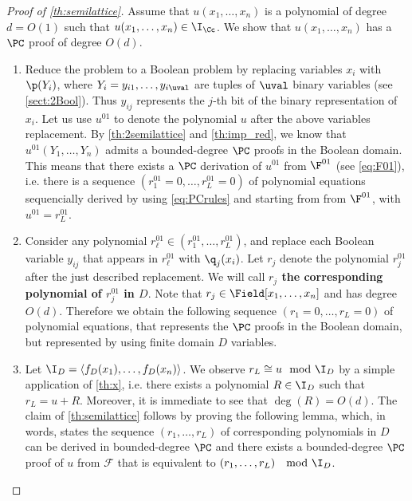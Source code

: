 \documentclass[11pt]{article}
\begin{document}
\begin{proof} [Proof of \cref{th:semilattice}]
    Assume that $u(x_1,\ldots,x_n)$ is a polynomial of degree $d=O(1)$ such that  $u(x_1,\ldots,x_n)\in \I_\Cc$. We show that $u(x_1,\ldots,x_n)$ has a $\PC$ proof of degree $O(d)$.
    \begin{enumerate}
        \item Reduce the problem to a Boolean problem by replacing variables $x_i$ with $\p(Y_i)$, where $Y_i = y_{i1}, \dots, y_{i\uval}$ are tuples of $\uval$ binary variables (see \cref{sect:2Bool}). Thus $y_{ij}$ represents the $j$-th bit of the binary representation of $x_i$. Let us use $u^{01}$ to denote the polynomial $u$ after the above variables replacement. By \cref{th:2semilattice} and \cref{th:imp_red}, we know that $u^{01}(Y_1,\ldots,Y_n)$ admits a bounded-degree $\PC$ proofs in the Boolean domain. This means that there exists a {$\PC$ derivation} of $u^{01}$ from $\F^{01}$ (see \cref{eq:F01}), i.e. there is a sequence $(r_1^{01}=0,\ldots,r_L^{01}=0)$ of polynomial equations sequencially derived by using \eqref{eq:PCrules} and starting from from $\F^{01}$, with $u^{01}=r_L^{01}$.
        \item\label{def_corr} Consider any polynomial $r^{01}_\ell\in (r_1^{01},\ldots,r_L^{01})$, and replace each Boolean variable $y_{ij}$ that appears in $r^{01}_\ell$ with $\q_j(x_i)$.  Let $r_j$ denote the polynomial $r_j^{01}$ after the just described replacement.
        We will call \textbf{$r_j$ the corresponding polynomial of $r_j^{01}$ in $D$}.
        Note that $r_j\in \Field[x_1, \ldots, x_n]$ and has degree $O(d)$. Therefore we obtain the following sequence $(r_1=0,\ldots,r_L=0)$ of polynomial equations, that represents the $\PC$ proofs in the Boolean domain, but represented by using finite domain $D$ variables.
        \item Let $\I_D=\langle f_D(x_1),\ldots,f_D(x_n)\rangle$. We observe $r_L \cong u \mod{\I_D}$ by a simple application of \cref{th:x}, i.e. there exists a polynomial $R \in \I_D$ such that $r_L = u + R$. Moreover, it is immediate to see that $\deg(R) = O(d)$. The claim of \cref{th:semilattice} follows by proving the following lemma, which, in words, states the sequence $(r_1, \dots, r_L)$ of corresponding polynomials in $D$ can be derived in bounded-degree $\PC$ and there exists a bounded-degree $\PC$ proof of $u$ from $\mathcal{F}$ that is equivalent to $(r_1, \dots, r_L) \ \mod{\I_D}$. 
    \end{enumerate}


\end{proof}
\end{document}

